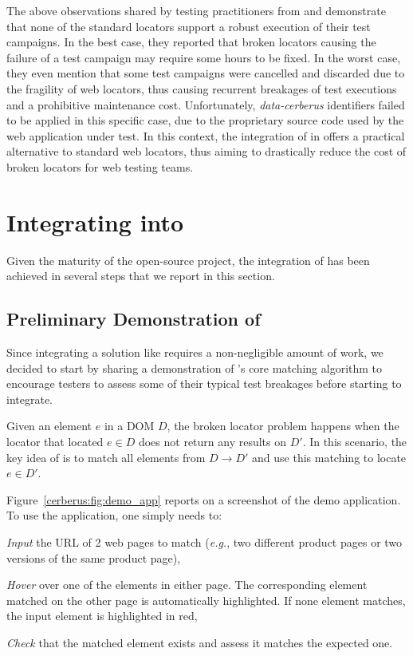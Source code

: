 The above observations shared by testing practitioners from \laredoute{} and \cerberus demonstrate that none of the standard locators support a robust execution of their test campaigns.
In the best case, they reported that broken locators causing the failure of a test campaign may require some hours to be fixed.
In the worst case, they even mention that some test campaigns were cancelled and discarded due to the fragility of web locators, thus causing recurrent breakages of test executions and a prohibitive maintenance cost.
Unfortunately, \textit{data-cerberus} identifiers failed to be applied in this specific case, due to the proprietary source code used by the web application under test.
In this context, the integration of \erratum{} in \cerberus{} offers a practical alternative to standard web locators, thus aiming to drastically reduce the cost of broken locators for web testing teams.

\section{Integrating \erratum into \cerberus}\label{cerberus:sec:integration}
Given the maturity of the \cerberus open-source project, the integration of \erratum{} has been achieved in several steps that we report in this section.

\subsection{Preliminary Demonstration of \erratum}\label{cerberus:sec:demo}
Since integrating a solution like \erratum requires a non-negligible amount of work, we decided to start by sharing a demonstration of \erratum's core matching algorithm to encourage testers to assess some of their typical test breakages before starting to integrate.

Given an element $e$ in a DOM $D$, the broken locator problem happens when the locator that located $e \in D$ does not return any results on $D'$.
In this scenario, the key idea of \erratum is to match all elements from $D \to D'$ and use this matching to locate $e \in D'$.

Figure~\ref{cerberus:fig:demo_app} reports on a screenshot of the demo application.
To use the application, one simply needs to:
\begin{compactenum}[\em i)]
    \item \emph{Input} the URL of 2 web pages to match (\emph{e.g.}, two different product pages or two versions of the same product page),
    \item \emph{Hover} over one of the elements in either page. The corresponding element matched on the other page is automatically highlighted. If none element matches, the input element is highlighted in red,
    \item \emph{Check} that the matched element exists and assess it matches the expected one.
\end{compactenum}

